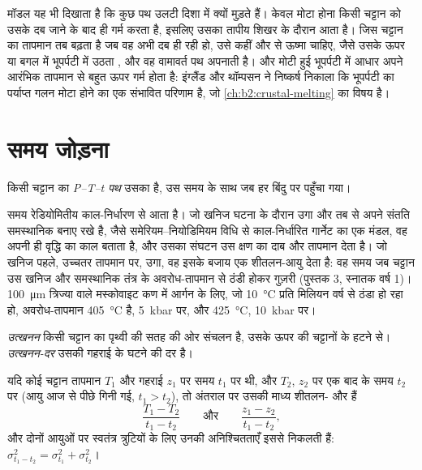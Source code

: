 मॉडल यह भी दिखाता है कि कुछ पथ उलटी दिशा में क्यों मुड़ते हैं। केवल मोटा होना किसी चट्टान को
उसके दब जाने के बाद ही गर्म करता है, इसलिए उसका तापीय शिखर  के दौरान आता है। जिस चट्टान का
तापमान तब बढ़ता है जब वह अभी दब ही रही हो, उसे कहीं और से ऊष्मा चाहिए, जैसे उसके ऊपर या बगल में
भूपर्पटी में उठता , और वह वामावर्त पथ अपनाती है। और
मोटी हुई भूपर्पटी में आधार अपने आरंभिक तापमान से बहुत ऊपर गर्म होता है: इंग्लैंड और थॉम्पसन
ने निष्कर्ष निकाला कि भूपर्पटी का पर्याप्त गलन मोटा होने का एक संभावित परिणाम है,
जो \cref{ch:b2:crustal-melting} का विषय है।

\section{समय जोड़ना}\label{sec:b2:pt-paths:time}

\begin{definition}[P--T--t पथ]\label{def:b2:pt-paths:ptt}
किसी चट्टान का \emph{P--T--t पथ} उसका  है, उस समय के साथ जब
हर बिंदु पर पहुँचा गया।
\end{definition}

समय रेडियोमितीय काल-निर्धारण से आता है। जो खनिज घटना के दौरान उगा और तब से अपने संतति समस्थानिक
बनाए रखे है, जैसे समेरियम--नियोडिमियम विधि से काल-निर्धारित
गार्नेट का एक मंडल, वह अपनी ही वृद्धि का काल बताता है, और उसका
संघटन उस क्षण का दाब और तापमान देता है। जो खनिज
पहले, उच्चतर तापमान पर, उगा, वह इसके बजाय एक शीतलन-आयु देता है: वह समय जब चट्टान
उस खनिज और समस्थानिक तंत्र के अवरोध-तापमान से ठंडी होकर गुज़री (पुस्तक 3,
स्नातक वर्ष 1)। \qty{100}{\micro m} त्रिज्या वाले मस्कोवाइट कण में आर्गन के लिए, जो
\qty{10}{\celsius} प्रति मिलियन वर्ष से ठंडा हो रहा हो, अवरोध-तापमान \qty{405}{\celsius} है, \qty{5}{kbar} पर, और
\qty{425}{\celsius}, \qty{10}{kbar} पर।

\begin{definition}\label{def:b2:pt-paths:exhumation}
\emph{उत्खनन} किसी चट्टान का पृथ्वी की सतह की ओर संचलन है,
उसके ऊपर की चट्टानों के हटने से। \emph{उत्खनन-दर} उसकी
गहराई के घटने की दर है।
\end{definition}

\begin{proposition}[दो काल-निर्धारित बिंदुओं से दरें]\label{prop:b2:pt-paths:rates}
यदि कोई चट्टान तापमान $T_1$ और गहराई $z_1$ पर समय $t_1$ पर थी, और $T_2$, $z_2$ पर एक
बाद के समय $t_2$ पर (आयु आज से पीछे गिनी गई, $t_1 > t_2$), तो अंतराल पर उसकी माध्य शीतलन- और
 हैं
\[
\frac{T_1 - T_2}{t_1 - t_2}
\qquad\text{और}\qquad
\frac{z_1 - z_2}{t_1 - t_2},
\]
और दोनों आयुओं पर स्वतंत्र त्रुटियों के लिए उनकी अनिश्चितताएँ इससे निकलती हैं:
$\sigma_{t_1 - t_2}^2 = \sigma_{t_1}^2 + \sigma_{t_2}^2$।
\end{proposition}

